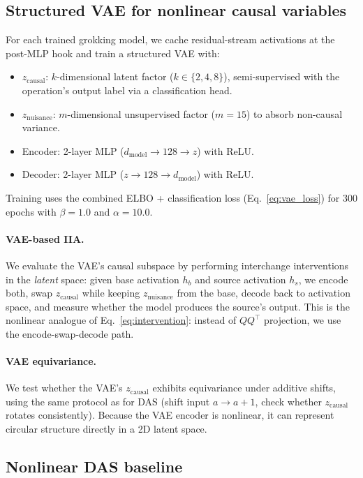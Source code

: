 \documentclass{article}
\begin{document}
\subsection{Structured VAE for nonlinear causal variables}
\label{sec:vae_method}

For each trained grokking model, we cache residual-stream activations at the
post-MLP hook and train a structured VAE with:
\begin{itemize}[leftmargin=*]
\item $z_\text{causal}$: $k$-dimensional latent factor ($k \in \{2,4,8\}$),
  semi-supervised with the operation's output label via a classification head.
\item $z_\text{nuisance}$: $m$-dimensional unsupervised factor ($m = 15$) to
  absorb non-causal variance.
\item Encoder: 2-layer MLP ($d_\text{model} \to 128 \to z$) with ReLU.
\item Decoder: 2-layer MLP ($z \to 128 \to d_\text{model}$) with ReLU.
\end{itemize}

Training uses the combined ELBO + classification loss (Eq.~\ref{eq:vae_loss})
for 300 epochs with $\beta = 1.0$ and $\alpha = 10.0$.

\paragraph{VAE-based IIA.}
We evaluate the VAE's causal subspace by performing interchange interventions in
the \emph{latent} space: given base activation $h_b$ and source activation
$h_s$, we encode both, swap $z_\text{causal}$ while keeping $z_\text{nuisance}$
from the base, decode back to activation space, and measure whether the model
produces the source's output. This is the nonlinear analogue of
Eq.~\ref{eq:intervention}: instead of $QQ^\top$ projection, we use the
encode-swap-decode path.

\paragraph{VAE equivariance.}
We test whether the VAE's $z_\text{causal}$ exhibits equivariance under additive
shifts, using the same protocol as for DAS (shift input $a \to a+1$, check
whether $z_\text{causal}$ rotates consistently). Because the VAE encoder is
nonlinear, it can represent circular structure directly in a 2D latent space.

\subsection{Nonlinear DAS baseline}
\label{sec:nldas}
\end{document}
